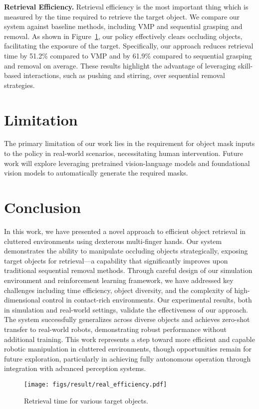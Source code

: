 \documentclass[10pt, a4paper, logo, twocolumn, copyright]{psibot} %
\begin{document}
\noindent \textbf{Retrieval Efficiency.}
Retrieval efficiency is the most important thing which is measured by the time required to retrieve the target object. We compare our system against baseline methods, including VMP and sequential grasping and removal. As shown in Figure~\ref{fig:real_efficiency}, our policy effectively clears occluding objects, facilitating the exposure of the target. Specifically, our approach reduces retrieval time by 51.2\% compared to VMP and by 61.9\% compared to sequential grasping and removal on average. These results highlight the advantage of leveraging skill-based interactions, such as pushing and stirring, over sequential removal strategies.

\section{Limitation}
The primary limitation of our work lies in the requirement for object mask inputs to the policy in real-world scenarios, necessitating human intervention. Future work will explore leveraging pretrained vision-language models and foundational vision models to automatically generate the required masks.

\section{Conclusion}

In this work, we have presented a novel approach to efficient object retrieval in cluttered environments using dexterous multi-finger hands. Our system demonstrates the ability to manipulate occluding objects strategically, exposing target objects for retrieval—a capability that significantly improves upon traditional sequential removal methods. Through careful design of our simulation environment and reinforcement learning framework, we have addressed key challenges including time efficiency, object diversity, and the complexity of high-dimensional control in contact-rich environments.
Our experimental results, both in simulation and real-world settings, validate the effectiveness of our approach. The system successfully generalizes across diverse objects and achieves zero-shot transfer to real-world robots, demonstrating robust performance without additional training. This work represents a step toward more efficient and capable robotic manipulation in cluttered environments, though opportunities remain for future exploration, particularly in achieving fully autonomous operation through integration with advanced perception systems.

\begin{figure}[t]
    \centering
    \texttt{[image: figs/result/real\_efficiency.pdf]}
    \caption{{Retrieval time for various target objects.}}
    \label{fig:real_efficiency}
\end{figure}




\end{document}
